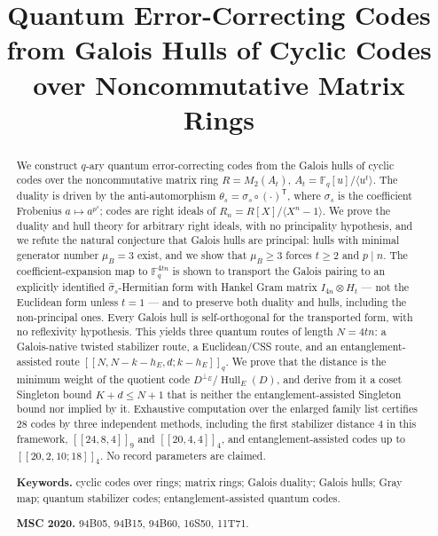 \documentclass[11pt,a4paper]{article}
\title{Quantum Error-Correcting Codes from Galois Hulls of Cyclic
       Codes over Noncommutative Matrix Rings}
\author{\AUTHORPLACEHOLDER}
\date{}
\newcommand{\F}{\mathbb F}
\newcommand{\Hull}{\operatorname{Hull}}
\newcommand{\Nlen}{N}
\newcommand{\MU}{\mu}
\theoremstyle{plain}
\theoremstyle{definition}
\theoremstyle{remark}
\begin{document}
\maketitle

\begin{abstract}
We construct $q$-ary quantum error-correcting codes from the Galois hulls of
cyclic codes over the noncommutative matrix ring $R=M_2(A_t)$,
$A_t=\F_q[u]/\langle u^t\rangle$.  The duality is driven by the
anti-automorphism $\theta_s=\sigma_s\circ(\cdot)^{\mathsf T}$, where
$\sigma_s$ is the coefficient Frobenius $a\mapsto a^{p^s}$; codes are right
ideals of $R_n=R[X]/\langle X^n-1\rangle$.  We prove the duality and hull
theory for arbitrary right ideals, with no principality hypothesis, and we
refute the natural conjecture that Galois hulls are principal: hulls with
minimal generator number $\MU_B=3$ exist, and we show that $\MU_B\ge3$ forces
$t\ge2$ and $p\mid n$.  The coefficient-expansion map to $\F_q^{4tn}$ is shown
to transport the Galois pairing to an explicitly identified
$\widehat\sigma_s$-Hermitian form with Hankel Gram matrix $I_{4n}\otimes H_t$
--- not the Euclidean form unless $t=1$ --- and to preserve both duality and
hulls, including the non-principal ones.  Every Galois hull is self-orthogonal
for the transported form, with no reflexivity hypothesis.  This yields three
quantum routes of length $\Nlen=4tn$: a Galois-native twisted stabilizer route,
a Euclidean/CSS route, and an entanglement-assisted route
$[[N,N-k-h_E,d;k-h_E]]_q$.  We prove that the distance is the minimum weight of
the quotient code $D^{\perp_E}/\Hull_E(D)$, and derive from it a coset
Singleton bound $K+d\le N+1$ that is neither the entanglement-assisted
Singleton bound nor implied by it.  Exhaustive computation over the enlarged
family list certifies $28$ codes by three independent methods, including the
first stabilizer distance $4$ in this framework, $[[24,8,4]]_9$ and
$[[20,4,4]]_4$, and entanglement-assisted codes up to $[[20,2,10;18]]_4$.  No
record parameters are claimed.

\smallskip
\noindent\textbf{Keywords.} cyclic codes over rings; matrix rings; Galois
duality; Galois hulls; Gray map; quantum stabilizer codes;
entanglement-assisted quantum codes.

\smallskip
\noindent\textbf{MSC 2020.} 94B05, 94B15, 94B60, 16S50, 11T71.
\end{abstract}

\tableofcontents
\bigskip












\appendix





\end{document}
